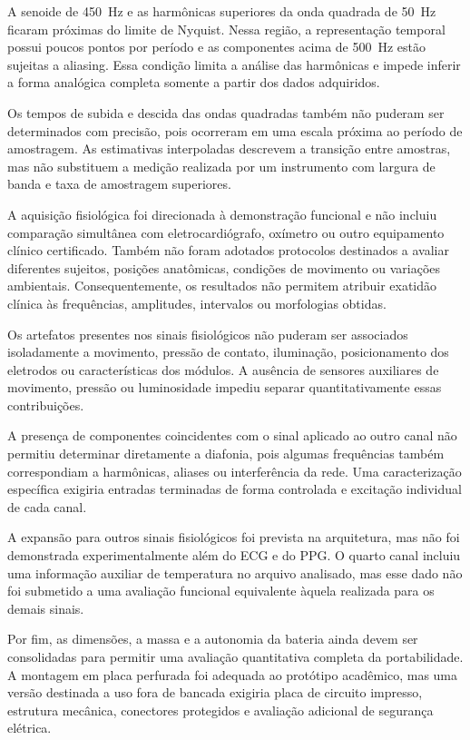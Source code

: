 \documentclass[a4paper,12pt]{fcte}
\begin{document}
A senoide de 450~Hz e as harmônicas superiores da onda quadrada de 50~Hz ficaram próximas do limite de Nyquist. Nessa região, a representação temporal possui poucos pontos por período e as componentes acima de 500~Hz estão sujeitas a aliasing. Essa condição limita a análise das harmônicas e impede inferir a forma analógica completa somente a partir dos dados adquiridos.

Os tempos de subida e descida das ondas quadradas também não puderam ser determinados com precisão, pois ocorreram em uma escala próxima ao período de amostragem. As estimativas interpoladas descrevem a transição entre amostras, mas não substituem a medição realizada por um instrumento com largura de banda e taxa de amostragem superiores.

A aquisição fisiológica foi direcionada à demonstração funcional e não incluiu comparação simultânea com eletrocardiógrafo, oxímetro ou outro equipamento clínico certificado. Também não foram adotados protocolos destinados a avaliar diferentes sujeitos, posições anatômicas, condições de movimento ou variações ambientais. Consequentemente, os resultados não permitem atribuir exatidão clínica às frequências, amplitudes, intervalos ou morfologias obtidas.

Os artefatos presentes nos sinais fisiológicos não puderam ser associados isoladamente a movimento, pressão de contato, iluminação, posicionamento dos eletrodos ou características dos módulos. A ausência de sensores auxiliares de movimento, pressão ou luminosidade impediu separar quantitativamente essas contribuições.

A presença de componentes coincidentes com o sinal aplicado ao outro canal não permitiu determinar diretamente a diafonia, pois algumas frequências também correspondiam a harmônicas, aliases ou interferência da rede. Uma caracterização específica exigiria entradas terminadas de forma controlada e excitação individual de cada canal.

A expansão para outros sinais fisiológicos foi prevista na arquitetura, mas não foi demonstrada experimentalmente além do ECG e do PPG. O quarto canal incluiu uma informação auxiliar de temperatura no arquivo analisado, mas esse dado não foi submetido a uma avaliação funcional equivalente àquela realizada para os demais sinais.

Por fim, as dimensões, a massa e a autonomia da bateria ainda devem ser consolidadas para permitir uma avaliação quantitativa completa da portabilidade. A montagem em placa perfurada foi adequada ao protótipo acadêmico, mas uma versão destinada a uso fora de bancada exigiria placa de circuito impresso, estrutura mecânica, conectores protegidos e avaliação adicional de segurança elétrica.
\end{document}
